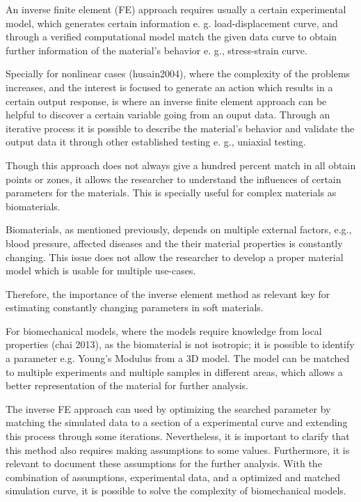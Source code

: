 An inverse finite element (FE) approach requires usually a certain experimental model,
 which generates certain information e. g. load-displacement curve, and through 
a verified computational model match the given data curve to obtain further information 
of the material's behavior e. g., stress-strain curve.

Specially for nonlinear cases (husain2004), where the complexity of the problems 
increases, and the interest is focused to generate an action which results in a 
certain output response, is where an inverse finite element approach can be helpful 
to discover a certain variable going from an ouput data. Through an iterative process it is 
possible to describe the material's behavior and validate the output data it 
through other established testing e. g., uniaxial testing.

Though this approach does not always give a hundred percent match in all obtain points 
or zones, it allows the researcher to understand the influences of certain parameters 
for the materials. This is specially useful for complex materials as biomaterials. 

Biomaterials, as mentioned previously, depends on multiple external factors, e.g., blood 
pressure, affected diseases and the their material properties is constantly changing. 
This issue does not allow the researcher to develop a proper material model which is 
usable for multiple use-cases. 

Therefore, the importance of the inverse element method as relevant key for estimating 
constantly changing parameters in soft materials.

For biomechanical models, where the models require knowledge from local properties (chai 2013),
as the biomaterial is not isotropic; it is possible to identify a parameter e.g. Young's Modulus 
from a 3D model. The model can be matched to multiple experiments and multiple samples in different areas,
which allows a better representation of the material for further analysis.

The inverse FE approach can used by optimizing the searched parameter by matching the simulated data
to a section of a experimental curve and extending this process through some iterations. 
Nevertheless, it is important to clarify that this method also requires making assumptions to some values.
Furthermore, it is relevant to document these assumptions for the further analysis. 
With the combination of assumptions, experimental data, and a optimized and matched simulation curve, it
is possible to solve the complexity of biomechanical models.
 

